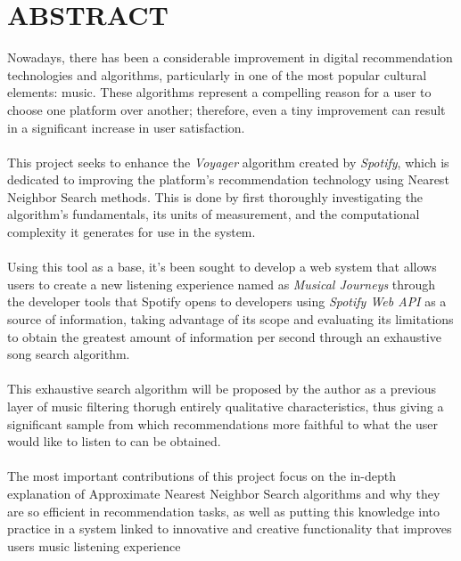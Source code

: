 \documentclass[12pt]{report}
\begin{document}
\newpage

\chapter*{ABSTRACT}

Nowadays, there has been a considerable improvement in digital recommendation technologies and algorithms, particularly in one of the most popular cultural elements: music. These algorithms represent a compelling reason for a user to choose one platform over another; therefore, even a tiny improvement can result in a significant increase in user satisfaction.
\\\\
This project seeks to enhance the \textit{Voyager} algorithm created by \textit{Spotify}, which is dedicated to improving the platform's recommendation technology using Nearest Neighbor Search methods.
This is done by first thoroughly investigating the algorithm's fundamentals, its units of measurement, and the computational complexity it generates for use in the system.
\\\\
Using this tool as a base, it's been sought to develop a web system that allows users to create a new listening experience named as \textit{Musical Journeys} through the developer tools that Spotify opens to developers using \textit{Spotify Web API} as a source of information, taking advantage of its scope and evaluating its limitations to obtain the greatest amount of information per second through an exhaustive song search algorithm.
\\\\
This exhaustive search algorithm will be proposed by the author as a previous layer of music filtering thorugh entirely qualitative characteristics, thus giving a significant sample from which recommendations more faithful to what the user would like to listen to can be obtained.
\\\\
The most important contributions of this project focus on the in-depth explanation of Approximate Nearest Neighbor Search algorithms and why they are so efficient in recommendation tasks, as well as putting this knowledge into practice in a system linked to innovative and creative functionality that improves users music listening experience

\newpage



\newpage




\cleardoublepage
{}
{}
\printbibliography 
\end{document}
